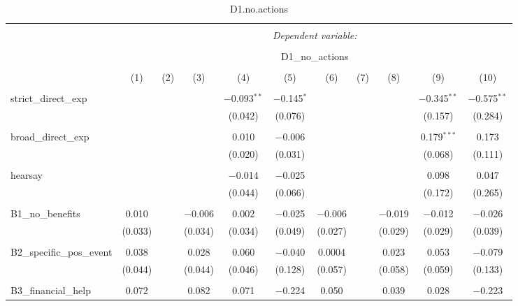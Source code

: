 
\begin{table}[H] \centering 
  \caption{D1.no.actions} 
  \label{} 
\tiny 
\begin{tabular}{@{\extracolsep{4pt}}lcccccccccc} 
\\[-1.8ex]\hline 
\hline \\[-1.8ex] 
 & \multicolumn{10}{c}{\textit{Dependent variable:}} \\ 
\cline{2-11} 
\\[-1.8ex] & \multicolumn{10}{c}{D1\_no\_actions} \\ 
\\[-1.8ex] & (1) & (2) & (3) & (4) & (5) & (6) & (7) & (8) & (9) & (10)\\ 
\hline \\[-1.8ex] 
 strict\_direct\_exp &  &  &  & $-$0.093$^{**}$ & $-$0.145$^{*}$ &  &  &  & $-$0.345$^{**}$ & $-$0.575$^{**}$ \\ 
  &  &  &  & (0.042) & (0.076) &  &  &  & (0.157) & (0.284) \\ 
  & & & & & & & & & & \\ 
 broad\_direct\_exp &  &  &  & 0.010 & $-$0.006 &  &  &  & 0.179$^{***}$ & 0.173 \\ 
  &  &  &  & (0.020) & (0.031) &  &  &  & (0.068) & (0.111) \\ 
  & & & & & & & & & & \\ 
 hearsay &  &  &  & $-$0.014 & $-$0.025 &  &  &  & 0.098 & 0.047 \\ 
  &  &  &  & (0.044) & (0.066) &  &  &  & (0.172) & (0.265) \\ 
  & & & & & & & & & & \\ 
 B1\_no\_benefits & 0.010 &  & $-$0.006 & 0.002 & $-$0.025 & $-$0.006 &  & $-$0.019 & $-$0.012 & $-$0.026 \\ 
  & (0.033) &  & (0.034) & (0.034) & (0.049) & (0.027) &  & (0.029) & (0.029) & (0.039) \\ 
  & & & & & & & & & & \\ 
 B2\_specific\_pos\_event & 0.038 &  & 0.028 & 0.060 & $-$0.040 & 0.0004 &  & 0.023 & 0.053 & $-$0.079 \\ 
  & (0.044) &  & (0.044) & (0.046) & (0.128) & (0.057) &  & (0.058) & (0.059) & (0.133) \\ 
  & & & & & & & & & & \\ 
 B3\_financial\_help & 0.072 &  & 0.082 & 0.071 & $-$0.224 & 0.050 &  & 0.039 & 0.028 & $-$0.223 \\ 

\end{tabular}
\end{table}
